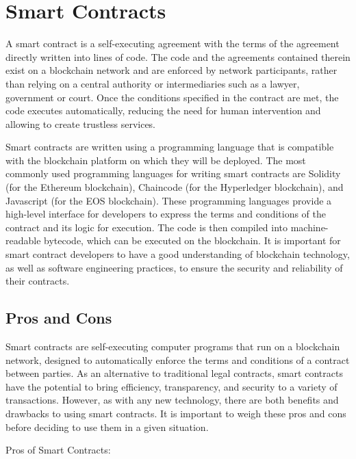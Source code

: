 \documentclass[target=mst,aauheader=]{thud}
\begin{document}
    \section{Smart Contracts}

    A smart contract is a self-executing agreement with the terms of the agreement directly written into lines of code. The code and the agreements contained therein exist on a blockchain network and are enforced by network participants, rather than relying on a central authority or intermediaries such as a lawyer, government or court. Once the conditions specified in the contract are met, the code executes automatically, reducing the need for human intervention and allowing to create trustless services.

    Smart contracts are written using a programming language that is compatible with the blockchain platform on which they will be deployed. The most commonly used programming languages for writing smart contracts are Solidity (for the Ethereum blockchain), Chaincode (for the Hyperledger blockchain), and Javascript (for the EOS blockchain). These programming languages provide a high-level interface for developers to express the terms and conditions of the contract and its logic for execution. The code is then compiled into machine-readable bytecode, which can be executed on the blockchain. It is important for smart contract developers to have a good understanding of blockchain technology, as well as software engineering practices, to ensure the security and reliability of their contracts.

    \subsection{Pros and Cons}

    Smart contracts are self-executing computer programs that run on a blockchain network, designed to automatically enforce the terms and conditions of a contract between parties. As an alternative to traditional legal contracts, smart contracts have the potential to bring efficiency, transparency, and security to a variety of transactions. However, as with any new technology, there are both benefits and drawbacks to using smart contracts. It is important to weigh these pros and cons before deciding to use them in a given situation.\par
    
    Pros of Smart Contracts:
\end{document}
